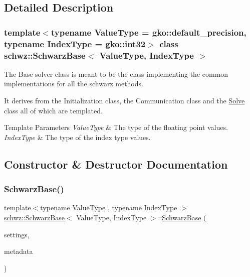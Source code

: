 \subsection{Detailed Description}
\subsubsection*{template$<$typename Value\+Type = gko\+::default\+\_\+precision, typename Index\+Type = gko\+::int32$>$\newline
class schwz\+::\+Schwarz\+Base$<$ Value\+Type, Index\+Type $>$}

The Base solver class is meant to be the class implementing the common implementations for all the schwarz methods. 

It derives from the Initialization class, the Communication class and the \hyperlink{classschwz_1_1Solve}{Solve} class all of which are templated.


\begin{DoxyTemplParams}{Template Parameters}
{\em Value\+Type} & The type of the floating point values. \\
\hline
{\em Index\+Type} & The type of the index type values. \\
\hline
\end{DoxyTemplParams}


\subsection{Constructor \& Destructor Documentation}
\mbox{\label{classschwz_1_1SchwarzBase_ab746eb6bb1c40d110ebd03cef0ddb415}} 
\subsubsection{\texorpdfstring{Schwarz\+Base()}{SchwarzBase()}}
{\footnotesize\ttfamily template$<$typename Value\+Type , typename Index\+Type $>$ \\
\hyperlink{classschwz_1_1SchwarzBase}{schwz\+::\+Schwarz\+Base}$<$ Value\+Type, Index\+Type $>$\+::\hyperlink{classschwz_1_1SchwarzBase}{Schwarz\+Base} (\begin{DoxyParamCaption}\item[{\hyperlink{structschwz_1_1Settings}{Settings} \&}]{settings,  }\item[{\hyperlink{structschwz_1_1Metadata}{Metadata}$<$ Value\+Type, Index\+Type $>$ \&}]{metadata }\end{DoxyParamCaption})}



